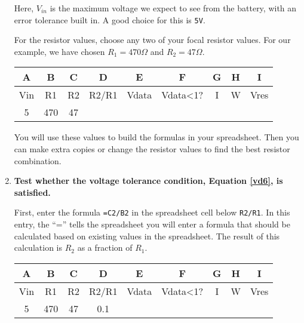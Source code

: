 \begin{enumerate}
	Here, $V_{in}$ is the maximum voltage we expect to see from the battery, with an error tolerance built in.
	A good choice for this is \texttt{5V}.

	\smallskip
	For the resistor values, choose any two of your focal resistor values.
	For our example, we have chosen $R_1=470\Omega$ and $R_2=47\Omega$.
	\begin{table}[H]
		\centering \begin{small}
		\begin{tabular}{|c|c|c|c|c|c|c|c|c|}
			\hline
			\textbf{A}  & \textbf{B} & \textbf{C} & \textbf{D} & \textbf{E} & \textbf{F} & \textbf{G} & \textbf{H} & \textbf{I} \\
			\hline
			Vin  & R1 & R2 & R2/R1 & Vdata & Vdata<1? & I & W & Vres \\
			\hline
			5 & 470  & 47 &  &  &  &  &  &  \\
			\hline
		\end{tabular}
	\end{small}
	\end{table}
	You will use these values to build the formulas in your spreadsheet.
	Then you can make extra copies or change the resistor values to find the best resistor combination.

	\item \textbf{Test whether the voltage tolerance condition, Equation \ref{vd6}, is satisfied.}

	First, enter the formula \lstinline{=C2/B2} in the spreadsheet cell below \texttt{R2/R1}.
	In this entry, the ``='' tells the spreadsheet you will enter a formula that should be calculated based on existing values in the spreadsheet.
	The result of this calculation is $R_2$ as a fraction of $R_1$.

	\begin{table}[H]
	\centering \begin{small}
	\begin{tabular}{|c|c|c|c|c|c|c|c|c|}
		\hline
		\textbf{A}  & \textbf{B} & \textbf{C} & \textbf{D} & \textbf{E} & \textbf{F} & \textbf{G} & \textbf{H} & \textbf{I} \\
		\hline
		Vin  & R1 & R2 & R2/R1 & Vdata & Vdata<1? & I & W & Vres \\
		\hline
		5 & 470  & 47 & 0.1 &  &  &  &  &  \\
		\hline
	\end{tabular}
	\end{small}
	\end{table}


\end{enumerate}
